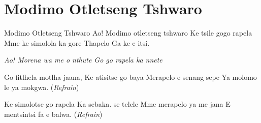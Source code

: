 \starttocol
\chapter{Modimo Otletseng Tshwaro}
\nexttocol
\hfill{\it }
\stoptocol
\starttocol
\startlines
{\sc Modimo} Otletseng Tshwaro
Ao! Modimo otletseng tshwaro
Ke tsile gogo rapela
Mme ke simolola ka gore
Thapelo Ga ke e itsi.

{\it Ao! Morena wa me o nthute
Go go rapela ka nnete}

Go fitlhela motlha jaana,  
Ke atisitse go baya
Merapelo e senang sepe
Ya molomo le ya mokgwa.
          \hfill({\it Refrain})~~~~~~~~~

Ke simolotse go rapela
Ka sebaka. se telele
Mme merapelo ya me jana
E mentsintsi fa e balwa.
          \hfill({\it Refrain})~~~~~~~~~
\stoplines
\nexttocol

\stoptocol
